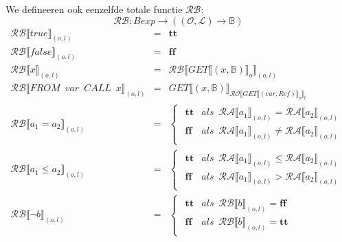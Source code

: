 \documentclass[12pt]{article}
\newcommand{\RA}{\mathcal{RA}}
\newcommand{\RB}{\mathcal{RB}}
\newcommand{\RO}{\mathcal{RO}}
\begin{document}
We defineeren ook eenzelfde totale functie $ \RB $:
\[ \RB : Bexp \rightarrow ((\mathcal{O},\mathcal{L}) \rightarrow \mathds{B} ) \]
\[
\begin{matrix}
\RB \llbracket true \rrbracket_{(o,l)} & = & \boldsymbol{tt}\\
\RB \llbracket false \rrbracket_{(o,l)} & = & \boldsymbol{ff}\\

\RB \llbracket x \rrbracket_{(o,l)} & = & \RB \llbracket GET\llbracket (x,\mathds{B}) \rrbracket_o \rrbracket_{(o,l)}\\

\RB \llbracket FROM \enspace var \enspace CALL \enspace x \rrbracket_{(o,l)} & = & GET\llbracket (x,\mathds{B}) \rrbracket_{\RO \llbracket GET\llbracket (var,Ref) \rrbracket_o \rrbracket_l}\\

\RB \llbracket a_1 = a_2 \rrbracket_{(o,l)} & = &
\begin{cases}
\begin{matrix}
\boldsymbol{tt} & als \enspace \RA\llbracket a_1 \rrbracket_{(o,l)} = \RA\llbracket a_2 \rrbracket_{(o,l)} \\
\boldsymbol{ff} & als \enspace \RA\llbracket a_1 \rrbracket_{(o,l)} \not= \RA\llbracket a_2 \rrbracket_{(o,l)}
\end{matrix}
\end{cases}\\

\RB \llbracket a_1 \leq a_2 \rrbracket_{(o,l)} & = &
\begin{cases}
\begin{matrix}
\boldsymbol{tt} & als \enspace \RA\llbracket a_1 \rrbracket_{(o,l)} \leq \RA\llbracket a_2 \rrbracket_{(o,l)} \\
\boldsymbol{ff} & als \enspace \RA\llbracket a_1 \rrbracket_{(o,l)} > \RA\llbracket a_2 \rrbracket_{(o,l)}
\end{matrix}
\end{cases}\\

\RB \llbracket \neg b \rrbracket_{(o,l)} & = &
\begin{cases}
\begin{matrix}
\boldsymbol{tt} & als \enspace \RB\llbracket b \rrbracket_{(o,l)} = \boldsymbol{ff} \\
\boldsymbol{ff} & als \enspace \RB\llbracket b \rrbracket_{(o,l)} = \boldsymbol{tt}
\end{matrix}
\end{cases}\\


\end{matrix}\]
\end{document}
